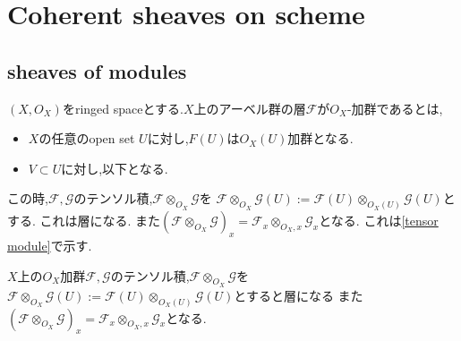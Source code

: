 
\section{Coherent sheaves on scheme}
\subsection{sheaves of modules}

\begin{screen}
\begin{dfn}
 $(X, O_X)$をringed spaceとする.$X$上のアーベル群の層$\mathcal{F}$が$O_X$-加群であるとは,
 \begin{itemize}
   \item $X$の任意のopen set $U$に対し,$F(U)$は$O_X(U)$加群となる.
   \item $V \subset U$に対し,以下となる.

 \end{itemize}
\end{dfn}
\end{screen}


この時,$\mathcal{F},\mathcal{G}$のテンソル積,$\mathcal{F} \otimes_{O_X} \mathcal{G}$を
$\mathcal{F} \otimes_{O_X} \mathcal{G}(U) := \mathcal{F}(U) \otimes_{O_X(U)} \mathcal{G}(U)$とする.
これは層になる.
また$(\mathcal{F} \otimes_{O_X} \mathcal{G})_x = \mathcal{F}_x \otimes_{O_X, x} \mathcal{G}_x$となる.
これは\ref{tensor module}で示す.


\begin{lem}
\label{tensor module}
$X$上の$O_X$加群$\mathcal{F},\mathcal{G}$のテンソル積,$\mathcal{F} \otimes_{O_X} \mathcal{G}$を
$\mathcal{F} \otimes_{O_X} \mathcal{G}(U) := \mathcal{F}(U) \otimes_{O_X(U)} \mathcal{G}(U)$とすると層になる
また$(\mathcal{F} \otimes_{O_X} \mathcal{G})_x = \mathcal{F}_x \otimes_{O_X, x} \mathcal{G}_x$となる.
\end{lem}
